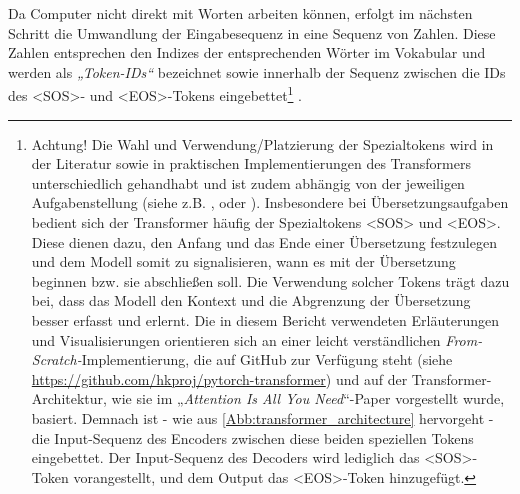 Da Computer nicht direkt mit Worten arbeiten können, erfolgt im nächsten Schritt die Umwandlung der Eingabesequenz in eine Sequenz von Zahlen. Diese Zahlen entsprechen den Indizes der entsprechenden Wörter im Vokabular und werden als \emph{„Token-IDs“} bezeichnet sowie innerhalb der Sequenz zwischen die IDs des <SOS>- und <EOS>-Tokens eingebettet\footnote{Achtung! Die Wahl und Verwendung/Platzierung der Spezialtokens wird in der Literatur sowie in praktischen Implementierungen des Transformers unterschiedlich gehandhabt und ist zudem abhängig von der jeweiligen Aufgabenstellung (siehe z.B. \cite{Transformer_Implementation_Google_Tensor2Tensor}, \cite{Transformer_Implementation_Harvard} oder \cite{Transformers_HuggingFace_Natural_Language}). Insbesondere bei Übersetzungsaufgaben bedient sich der Transformer häufig der Spezialtokens <SOS> und <EOS>. Diese dienen dazu, den Anfang und das Ende einer Übersetzung festzulegen und dem Modell somit zu signalisieren, wann es mit der Übersetzung beginnen bzw. sie abschließen soll. Die Verwendung solcher Tokens trägt dazu bei, dass das Modell den Kontext und die Abgrenzung der Übersetzung besser erfasst und erlernt. Die in diesem Bericht verwendeten Erläuterungen und Visualisierungen orientieren sich an einer leicht verständlichen \emph{From-Scratch-}Implementierung, die auf GitHub zur Verfügung steht (siehe \href{https://github.com/hkproj/pytorch-transformer}{https://github.com/hkproj/pytorch-transformer}) und auf der Transformer-Architektur, wie sie im „\emph{Attention Is All You Need}“-Paper vorgestellt wurde, basiert. Demnach ist - wie aus \cref{Abb:transformer_architecture} hervorgeht - die Input-Sequenz des Encoders zwischen diese beiden speziellen Tokens eingebettet. Der Input-Sequenz des Decoders wird lediglich das <SOS>-Token vorangestellt, und dem Output das <EOS>-Token hinzugefügt.} \cite{Formal_Algorithms_for_Transformers_DeepMind}. 


